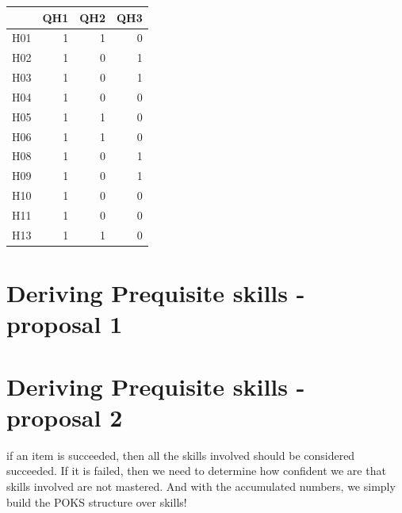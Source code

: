 \documentclass[11pt]{article}\usepackage[]{graphicx}\usepackage[]{color}
\begin{document}
\begin{table}[ht]
\centering
\begin{tabular}{rrrr}
  \hline
 & QH1 & QH2 & QH3 \\ 
  \hline
H01 & 1 & 1 & 0 \\ 
  H02 & 1 & 0 & 1 \\ 
  H03 & 1 & 0 & 1 \\ 
  H04 & 1 & 0 & 0 \\ 
  H05 & 1 & 1 & 0 \\ 
  H06 & 1 & 1 & 0 \\ 
  H08 & 1 & 0 & 1 \\ 
  H09 & 1 & 0 & 1 \\ 
  H10 & 1 & 0 & 0 \\ 
  H11 & 1 & 0 & 0 \\ 
  H13 & 1 & 1 & 0 \\ 
   \hline
\end{tabular}
\end{table}



\section{Deriving Prequisite skills - proposal 1}

\section{Deriving Prequisite skills - proposal 2}
if an item is succeeded, then all the skills involved should be considered succeeded.  If it is failed, then we need to determine how confident we are that skills involved are not mastered. And with the accumulated numbers, we simply build the POKS structure over skills!
\end{document}
